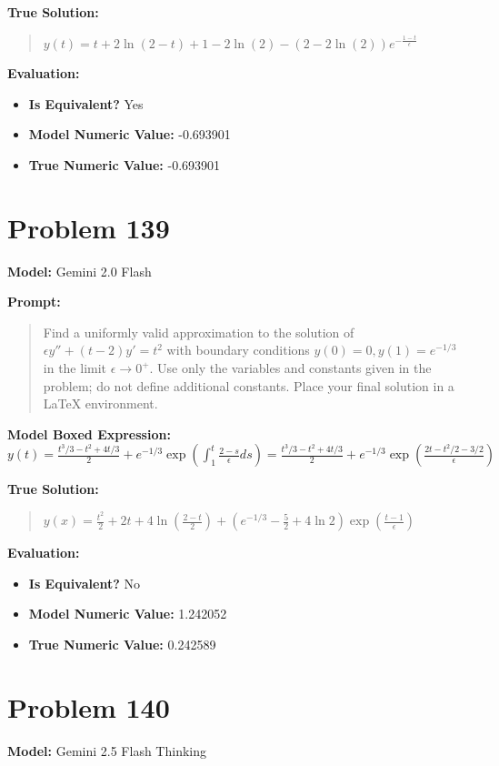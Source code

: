 \documentclass{article}
\begin{document}
{\textbf{True Solution:}
\begin{quote}
$y(t) = t + 2 \ln(2-t) + 1 - 2 \ln(2) - (2 - 2 \ln(2)) e^{-\frac{1-t}{\epsilon}}$
\end{quote}

\textbf{Evaluation:}
\begin{itemize}
\item \textbf{Is Equivalent?} Yes
\item \textbf{Model Numeric Value:} -0.693901
\item \textbf{True Numeric Value:} -0.693901
\end{itemize}
\vspace{1cm}
\section*{Problem 139}
\textbf{Model:} Gemini 2.0 Flash

\textbf{Prompt:}
\begin{quote}
Find a uniformly valid approximation to the solution of $\epsilon y'' + (t-2) y' = t^2$ with boundary conditions $y(0) = 0, y(1) = e^{-1/3}$ in the limit $\epsilon \to 0^+$. Use only the variables and constants given in the problem; do not define additional constants. Place your final solution in a $\boxed{}$ LaTeX environment.
\end{quote}
\textbf{Model Boxed Expression:} $y(t) = \frac{t^3/3 - t^2 + 4t/3}{2} + e^{-1/3} \exp\left(\int_1^t \frac{2-s}{\epsilon} ds\right) = \frac{t^3/3 - t^2 + 4t/3}{2} + e^{-1/3} \exp\left(\frac{2t - t^2/2 - 3/2}{\epsilon}\right)$

\textbf{True Solution:}
\begin{quote}
$y(x) = \frac{t^2}{2} + 2t + 4\ln \left( \frac{2-t}{2} \right) + \left( e^{-1/3} -\frac{5}{2} + 4\ln 2 \right)\exp\left( \frac{t-1}{\epsilon}\right)$
\end{quote}

\textbf{Evaluation:}
\begin{itemize}
\item \textbf{Is Equivalent?} No
\item \textbf{Model Numeric Value:} 1.242052
\item \textbf{True Numeric Value:} 0.242589
\end{itemize}
\vspace{1cm}
\section*{Problem 140}
\textbf{Model:} Gemini 2.5 Flash Thinking

}
\end{document}
